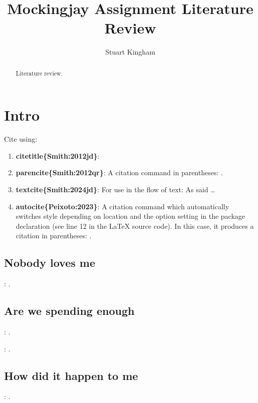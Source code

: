 \documentclass{article}
\title{Mockingjay Assignment Literature Review}
\author{Stuart Kingham}
\begin{document}
\maketitle

\begin{abstract}
Literature review.
\end{abstract}

\tableofcontents

\section{Intro}

Cite using:
\begin{enumerate}
\item \textbf{citetitle\{Smith:2012jd\}}: 
\item \textbf{parencite\{Smith:2012qr\}}: A citation command in parentheses: \parencite{Smith:2023qr}.
\item \textbf{textcite\{Smith:2024jd\}}: For use in the flow of text: As \textcite{Smith:2024jd} said \dots
\item \textbf{autocite\{Peixoto:2023\}}: A citation command which automatically switches style depending on
  location and the option setting in the package declaration (see line 12 in the LaTeX source code). In this
  case, it produces a citation in parentheses: \autocite{Peixoto:2023}.
\end{enumerate}

\subsection{Nobody loves me}

\textbf{}: \textcite{Milica:2023}.


\subsection{Are we spending enough}

\textbf{}: \textcite{FBI:2023}.

\textbf{}: \textcite{Hiscox:2022}.


\subsection{How did it happen to me}

\textbf{}: \textcite{CVE-2023-3467}.
\end{document}
